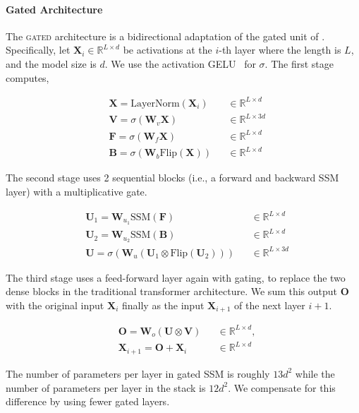 \paragraph{Gated Architecture} The \textsc{gated} architecture is a bidirectional adaptation of the gated unit of \citet{hua2022transformer}. Specifically, let $\mathbf{X}_i \in \mathbb{R}^{L\times d}$ be activations at the $i$-th layer where the length is $L$, and the model size is $d$. We use the activation GELU~\cite{hendrycks2016gaussian} for $\sigma$. The first stage computes,

\begin{align*}
& \mathbf{X}=\text{LayerNorm}(\mathbf{X}_i )   && \in \mathbb{R}^{L\times d} \\
& \mathbf{V}=\sigma(\mathbf{W}_v \mathbf{X})     && \in \mathbb{R}^{L\times 3d} \\
& \mathbf{F}=\sigma(\mathbf{W}_{f} \mathbf{X})   && \in \mathbb{R}^{L\times d}  \\
& \mathbf{B}=\sigma(\mathbf{W}_{b} \text{Flip}(\mathbf{X})) && \in \mathbb{R}^{L\times d}
\end{align*}

 The second stage uses 2 sequential blocks (i.e., a forward and backward SSM layer) with a multiplicative gate.

\begin{align*}
& \mathbf{U}_1 = \mathbf{W}_{u_1} \text{SSM}(\mathbf{F}) && \in \mathbb{R}^{L\times d}\\
& \mathbf{U}_2 = \mathbf{W}_{u_2} \text{SSM}(\mathbf{B}) && \in \mathbb{R}^{L\times d}\\
& \mathbf{U} = \sigma(\mathbf{W}_u (\mathbf{U}_1 \otimes \text{Flip}(\mathbf{U}_2))) && \in \mathbb{R}^{L\times 3d}
\end{align*}

 The third stage uses a feed-forward layer again with gating, to replace the two dense blocks in the traditional transformer architecture. We sum this output $\mathbf{O}$ with the original input $\mathbf{X}_i$ finally as the input $\mathbf{X}_{i+1}$ of the next layer $i+1$.

\begin{align*}
& \mathbf{O} = \mathbf{W}_o (\mathbf{U}\otimes \mathbf{V}) && \in \mathbb{R}^{L\times d},\\
& \mathbf{X}_{i+1} = \mathbf{O} + \mathbf{X}_i && \in \mathbb{R}^{L\times d}
\end{align*}

The number of parameters per layer in gated SSM is roughly $13d^2$ while the number of parameters per layer in the stack is $12d^2$. We compensate for this difference by using fewer gated layers.

